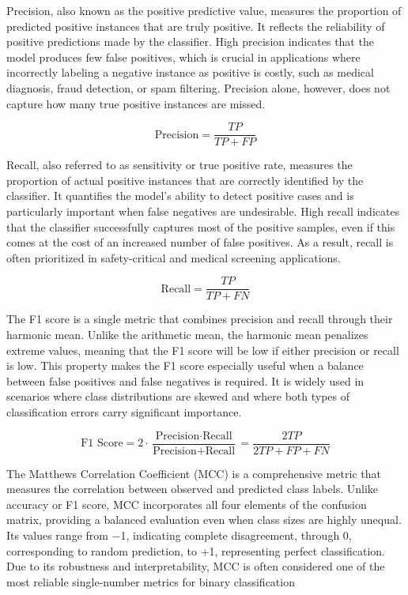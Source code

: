 \documentclass[en]{dimscthesis}
\begin{document}
Precision, also known as the positive predictive value, measures the proportion of predicted positive instances that are truly positive. It reflects the reliability of positive predictions made by the classifier. High precision indicates that the model produces few false positives, which is crucial in applications where incorrectly labeling a negative instance as positive is costly, such as medical diagnosis, fraud detection, or spam filtering. Precision alone, however, does not capture how many true positive instances are missed. 

\begin{equation}
	\text{Precision}
	= \frac{TP}{TP + FP}
\end{equation}

Recall, also referred to as sensitivity or true positive rate, measures the proportion of actual positive instances that are correctly identified by the classifier. It quantifies the model’s ability to detect positive cases and is particularly important when false negatives are undesirable. High recall indicates that the classifier successfully captures most of the positive samples, even if this comes at the cost of an increased number of false positives. As a result, recall is often prioritized in safety-critical and medical screening applications. 

\begin{equation}
	\text{Recall}
	= \frac{TP}{TP + FN}
\end{equation}

The F1 score is a single metric that combines precision and recall through their harmonic mean. Unlike the arithmetic mean, the harmonic mean penalizes extreme values, meaning that the F1 score will be low if either precision or recall is low. This property makes the F1 score especially useful when a balance between false positives and false negatives is required. It is widely used in scenarios where class distributions are skewed and where both types of classification errors carry significant importance. 

\begin{equation}
	\text{F1 Score}
	= 2 \cdot \frac{\text{Precision} \cdot \text{Recall}}
	{\text{Precision} + \text{Recall}}
	= \frac{2TP}{2TP + FP + FN}
\end{equation}

The Matthews Correlation Coefficient (MCC) is a comprehensive metric that measures the correlation between observed and predicted class labels. Unlike accuracy or F1 score, MCC incorporates all four elements of the confusion matrix, providing a balanced evaluation even when class sizes are highly unequal. Its values range from −1, indicating complete disagreement, through 0, corresponding to random prediction, to +1, representing perfect classification. Due to its robustness and interpretability, MCC is often considered one of the most reliable single-number metrics for binary classification
\end{document}
